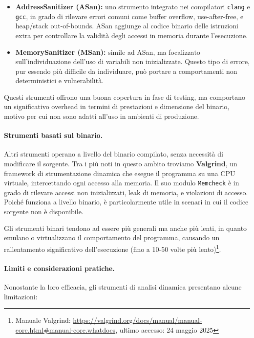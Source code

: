 \begin{itemize}
  \item \textbf{AddressSanitizer (ASan):} uno strumento integrato nei
    compilatori \texttt{clang} e \texttt{gcc}, in grado di rilevare errori comuni
    come buffer overflow, use-after-free, e heap/stack out-of-bounds. ASan
    aggiunge al codice binario delle istruzioni extra per controllare la
    validità degli accessi in memoria durante l'esecuzione.

  \item \textbf{MemorySanitizer (MSan):} simile ad ASan, ma focalizzato sull'individuazione
    dell'uso di variabili non inizializzate. Questo tipo di errore, pur essendo più
    difficile da individuare, può portare a comportamenti non deterministici e
    vulnerabilità.
\end{itemize}

Questi strumenti offrono una buona copertura in fase di testing, ma comportano
un significativo overhead in termini di prestazioni e dimensione del binario, motivo
per cui non sono adatti all'uso in ambienti di produzione.

\paragraph{Strumenti basati sul binario.}
Altri strumenti operano a livello del binario compilato, senza necessità di modificare
il sorgente. Tra i più noti in questo ambito troviamo \textbf{Valgrind}, un
framework di strumentazione dinamica che esegue il programma su una CPU virtuale,
intercettando ogni accesso alla memoria. Il suo modulo \texttt{Memcheck} è in grado
di rilevare accessi non inizializzati, leak di memoria, e violazioni di accesso.
Poiché funziona a livello binario, è particolarmente utile in scenari in cui il codice
sorgente non è disponibile.

Gli strumenti binari tendono ad essere più generali ma anche più lenti, in
quanto emulano o virtualizzano il comportamento del programma, causando un rallentamento
significativo dell'esecuzione (fino a 10-50 volte più lento)\footnote{Manuale
Valgrind: \url{https://valgrind.org/docs/manual/manual-core.html\#manual-core.whatdoes},
ultimo accesso: 24 maggio 2025}.

\paragraph{Limiti e considerazioni pratiche.}
Nonostante la loro efficacia, gli strumenti di analisi dinamica presentano
alcune limitazioni:


